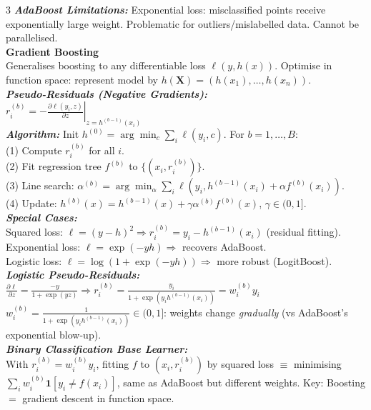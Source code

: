 \documentclass[a4paper,7pt]{article}
\begin{document}
\begin{multicols*}{3}
\textit{\textbf{AdaBoost Limitations:}} Exponential loss: misclassified points receive exponentially large weight. Problematic for outliers/mislabelled data. Cannot be parallelised.\\

\textbf{Gradient Boosting}\\
Generalises boosting to any differentiable loss $\ell(y,h(x))$. Optimise in function space: represent model by $h(\mathbf{X})=(h(x_1),\ldots,h(x_n))$.\\

\textit{\textbf{Pseudo-Residuals (Negative Gradients):}}\\
$r_i^{(b)}=-\left.\frac{\partial\ell(y_i,z)}{\partial z}\right|_{z=h^{(b-1)}(x_i)}$\\

\textit{\textbf{Algorithm:}} Init $h^{(0)}=\arg\min_c\sum_i\ell(y_i,c)$. For $b=1,\ldots,B$:\\
(1) Compute $r_i^{(b)}$ for all $i$. \\
(2) Fit regression tree $f^{(b)}$ to $\{(x_i,r_i^{(b)})\}$. \\
(3) Line search: $\alpha^{(b)}=\arg\min_\alpha\sum_i\ell(y_i,h^{(b-1)}(x_i)+\alpha f^{(b)}(x_i))$. \\
(4) Update: $h^{(b)}(x)=h^{(b-1)}(x)+\gamma\alpha^{(b)}f^{(b)}(x)$, $\gamma\in(0,1]$.\\

\textit{\textbf{Special Cases:}}\\
Squared loss: $\ell=(y-h)^2\Rightarrow r_i^{(b)}=y_i-h^{(b-1)}(x_i)$ (residual fitting).\\
Exponential loss: $\ell=\exp(-yh)\Rightarrow$ recovers AdaBoost.\\
Logistic loss: $\ell=\log(1+\exp(-yh))\Rightarrow$ more robust (LogitBoost).\\

\textit{\textbf{Logistic Pseudo-Residuals:}}\\
$\frac{\partial\ell}{\partial z}=\frac{-y}{1+\exp(yz)}\Rightarrow r_i^{(b)}=\frac{y_i}{1+\exp(y_ih^{(b-1)}(x_i))}=w_i^{(b)}y_i$\\
$w_i^{(b)}=\frac{1}{1+\exp(y_ih^{(b-1)}(x_i))}\in(0,1]$: weights change \emph{gradually} (vs AdaBoost's exponential blow-up).\\

\textit{\textbf{Binary Classification Base Learner:}} \\With $r_i^{(b)}=w_i^{(b)}y_i$, fitting $f$ to $(x_i,r_i^{(b)})$ by squared loss $\equiv$ minimising $\sum_i w_i^{(b)}\mathbf{1}[y_i\neq f(x_i)]$, same as AdaBoost but different weights. Key: Boosting $=$ gradient descent in function space.\\


\end{multicols*}
\end{document}
